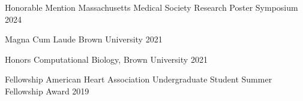 


\begin{cvhonors}

  \cvhonor
    {Honorable Mention} %
    {Massachusetts Medical Society Research Poster Symposium} %
    {2024} %

  \cvhonor
    {Magna Cum Laude} %
    {Brown University} %
    {2021} %

  \cvhonor
    {Honors} %
    {Computational Biology, Brown University} %
    {2021} %

  \cvhonor
    {Fellowship} %
    {American Heart Association Undergraduate Student Summer Fellowship Award} %
    {2019} %

\end{cvhonors}




